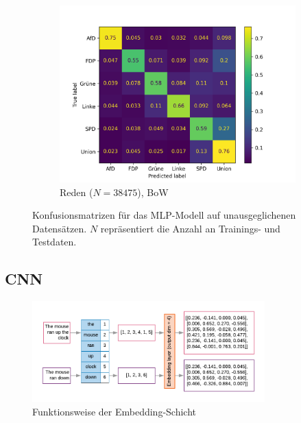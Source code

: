 \begin{figure}[H]
\begin{subfigure}{0.49\textwidth}
    \includegraphics[width=\textwidth]{data/images/modeling/mlp/speeches_confusion_matrix.png}
    \caption{Reden (\(N=\num{38475}\)), \ac{BoW}}
    \label{sfig:confusionMatrixMlpSpeeches}
\end{subfigure}
\caption[Konfusionsmatrizen für das \acs{MLP}-Modell auf unausgeglichenen Datensätzen]{Konfusionsmatrizen für das \acs{MLP}-Modell auf unausgeglichenen Datensätzen. $N$ repräsentiert die Anzahl an Trainings- und Testdaten.} \label{fig:confusionMatrixMlp}
\end{figure}

\subsection{CNN}

\begin{figure}[H]
  \centering
  \includegraphics[width=0.8\textwidth]{data/images/embedding_layer.png}
  \caption{Funktionsweise der Embedding-Schicht} \label{fig:embeddingLayer}
\end{figure}

